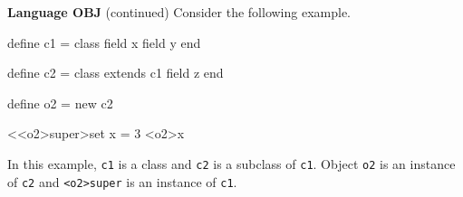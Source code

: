 \begin{minipage}[t]{\sw}
\slidenumber
\LARGE
{\bf Language OBJ} (continued)\exx
Consider the following example.
{\Large
\begin{qv}
define c1 =
  class %
    field x
    field y
  end

define c2 = 
  class extends c1
    field z
  end

define o2 = new c2

<<o2>super>set x = 3
<o2>x %
\end{qv}
}
In this example, \verb'c1' is a class
and \verb'c2' is a subclass of \verb'c1'.
Object \verb'o2' is an instance of \verb'c2'
and \verb'<o2>super' is an instance of \verb'c1'.  
\end{minipage}
